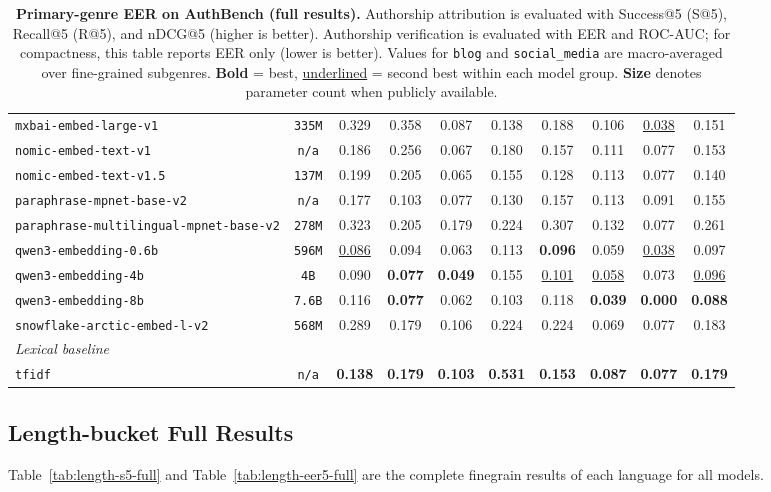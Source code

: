 \documentclass{article}
\newcommand{\rev}[1]{#1}
\begin{document}
\begin{table}[htbp]
{\begin{tabular}{lccccccccc}
\texttt{mxbai-embed-large-v1} & \texttt{335M} & 0.329 & 0.358 & 0.087 & 0.138 & 0.188 & 0.106 & \underline{0.038} & 0.151 \\
\texttt{nomic-embed-text-v1} & \texttt{n/a} & 0.186 & 0.256 & 0.067 & 0.180 & 0.157 & 0.111 & 0.077 & 0.153 \\
\texttt{nomic-embed-text-v1.5} & \texttt{137M} & 0.199 & 0.205 & 0.065 & 0.155 & 0.128 & 0.113 & 0.077 & 0.140 \\
\texttt{paraphrase-mpnet-base-v2} & \texttt{n/a} & 0.177 & 0.103 & 0.077 & 0.130 & 0.157 & 0.113 & 0.091 & 0.155 \\
\texttt{paraphrase-multilingual-mpnet-base-v2} & \texttt{278M} & 0.323 & 0.205 & 0.179 & 0.224 & 0.307 & 0.132 & 0.077 & 0.261 \\
\texttt{qwen3-embedding-0.6b} & \texttt{596M} & \underline{0.086} & 0.094 & 0.063 & 0.113 & \textbf{0.096} & 0.059 & \underline{0.038} & 0.097 \\
\texttt{qwen3-embedding-4b} & \texttt{4B} & 0.090 & \textbf{0.077} & \textbf{0.049} & 0.155 & \underline{0.101} & \underline{0.058} & 0.073 & \underline{0.096} \\
\texttt{qwen3-embedding-8b} & \texttt{7.6B} & 0.116 & \textbf{0.077} & 0.062 & 0.103 & 0.118 & \textbf{0.039} & \textbf{0.000} & \textbf{0.088} \\
\texttt{snowflake-arctic-embed-l-v2} & \texttt{568M} & 0.289 & 0.179 & 0.106 & 0.224 & 0.224 & 0.069 & 0.077 & 0.183 \\
\midrule
\multicolumn{10}{l}{\textit{Lexical baseline}} \\
\midrule
\texttt{tfidf} & \texttt{n/a} & \textbf{0.138} & \textbf{0.179} & \textbf{0.103} & \textbf{0.531} & \textbf{0.153} & \textbf{0.087} & \textbf{0.077} & \textbf{0.179} \\
\bottomrule
\end{tabular}
}
\caption{\textbf{Primary-genre EER on AuthBench (full results).} Authorship attribution is evaluated with Success@5 (S@5), Recall@5 (R@5), and nDCG@5 (higher is better). \rev{Authorship verification is evaluated with EER and ROC-AUC; for compactness, this table reports EER only (lower is better).} Values for \texttt{blog} and \texttt{social\_media} are macro-averaged over fine-grained subgenres. \textbf{Bold} = best, \underline{underlined} = second best within each model group. \textbf{Size} denotes parameter count when publicly available.}
\label{tab:genre-eer5-full}
\end{table}

\subsection{Length-bucket Full Results}
Table~\ref{tab:length-s5-full} and Table~\ref{tab:length-eer5-full} are the complete finegrain results of each language for all models.
\end{document}
